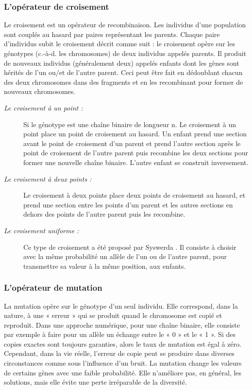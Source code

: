 	\subsubsection{L’opérateur de croisement}
	Le croisement est un opérateur de recombinaison. Les individus d’une population sont couplés au hasard par paires représentant les parents. Chaque paire d’individus
subit le croisement décrit comme suit : le croisement opère sur les génotypes (c.-à-d. les chromosomes) de deux individus appelés parents. Il produit de nouveaux individus (généralement deux) appelés enfants dont les gènes sont hérités de l’un ou/et de l’autre parent. Ceci peut être fait en dédoublant chacun des deux chromosomes dans des fragments et en les recombinant pour former de nouveaux chromosomes.
	\begin{description}
		\item[\textsl{Le croisement à un point :}] Si le génotype est une chaîne binaire de longueur n. Le croisement à un point place un point de croisement au
hasard. Un enfant prend une section avant le point de croisement d’un parent et prend l’autre section après le point de croisement de l’autre parent puis recombine les deux sections pour former une nouvelle chaîne binaire. L’autre enfant se construit inversement. 
		
		\item[\textsl{Le croisement à deux points :}]Le croisement à deux points place deux points de croisement au hasard, et prend une section entre les points d’un parent et les autres sections en dehors des points de l’autre parent puis les recombine. 
	
		\item[\textsl{Le croisement uniforme :}]Ce type de croisement a été proposé par Syswerda \cite{Syswerda}. Il consiste à choisir avec la même probabilité un allèle de l’un ou de l’autre parent, pour transmettre sa valeur à la même position, aux enfants. 
	
	\end{description}
	
	\subsubsection{L'opérateur de mutation}
	
	La mutation opère sur le génotype d’un seul individu. Elle correspond, dans la nature, à une « erreur » qui se produit quand le chromosome est copié et reproduit. Dans une approche numérique, pour une chaîne binaire, elle consiste par exemple à faire pour un allèle un échange entre le « 0 » et le « 1 ». Si des copies exactes sont toujours garanties, alors le taux de mutation est égal à zéro. Cependant, dans la vie réelle, l’erreur de copie peut se produire dans diverses circonstances comme sous l’influence d’un bruit. La mutation change les valeurs de certains gènes avec une faible probabilité. Elle n’améliore pas, en général, les solutions, mais elle évite une perte irréparable de la diversité.
	
